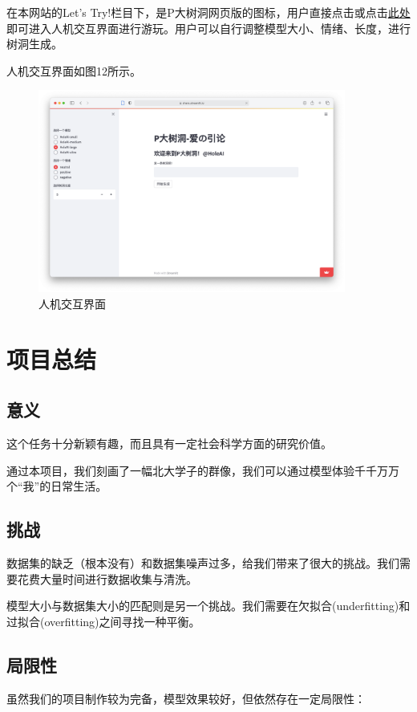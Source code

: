 \documentclass[12pt,a4paper]{article}
\begin{document}
在本网站的Let's Try!栏目下，是P大树洞网页版的图标，用户直接点击或点击\href{https://share.streamlit.io/hirojifukuyama/pkuhole/app.py}{此处}即可进入人机交互界面进行游玩。用户可以自行调整模型大小、情绪、长度，进行树洞生成。

人机交互界面如图12所示。

\begin{figure}[!h]
        \centering
        \includegraphics[width=0.9\textwidth]{界面3.png}
        \caption{人机交互界面}
\end{figure}

\section{项目总结}
\subsection{意义}
这个任务十分新颖有趣，而且具有一定社会科学方面的研究价值。

通过本项目，我们刻画了一幅北大学子的群像，我们可以通过模型体验千千万万个“我”的日常生活。
\subsection{挑战}
数据集的缺乏（根本没有）和数据集噪声过多，给我们带来了很大的挑战。我们需要花费大量时间进行数据收集与清洗。

模型大小与数据集大小的匹配则是另一个挑战。我们需要在欠拟合(underfitting)和过拟合(overfitting)之间寻找一种平衡。
\subsection{局限性}
虽然我们的项目制作较为完备，模型效果较好，但依然存在一定局限性：
\end{document}
